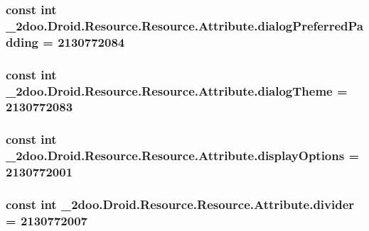 \hypertarget{class__2doo_1_1_droid_1_1_resource_1_1_attribute_50098b9f4818622b5467f03b505deaad}{
\subsubsection[{dialogPreferredPadding}]{\setlength{\rightskip}{0pt plus 5cm}const int \_\-2doo.Droid.Resource.Resource.Attribute.dialogPreferredPadding = 2130772084}}
\label{class__2doo_1_1_droid_1_1_resource_1_1_attribute_50098b9f4818622b5467f03b505deaad}


\hypertarget{class__2doo_1_1_droid_1_1_resource_1_1_attribute_bc571f819c346596fd5dbe29a2e3cd86}{
\subsubsection[{dialogTheme}]{\setlength{\rightskip}{0pt plus 5cm}const int \_\-2doo.Droid.Resource.Resource.Attribute.dialogTheme = 2130772083}}
\label{class__2doo_1_1_droid_1_1_resource_1_1_attribute_bc571f819c346596fd5dbe29a2e3cd86}


\hypertarget{class__2doo_1_1_droid_1_1_resource_1_1_attribute_68a63a7d1077b26855834a7e387400d9}{
\subsubsection[{displayOptions}]{\setlength{\rightskip}{0pt plus 5cm}const int \_\-2doo.Droid.Resource.Resource.Attribute.displayOptions = 2130772001}}
\label{class__2doo_1_1_droid_1_1_resource_1_1_attribute_68a63a7d1077b26855834a7e387400d9}


\hypertarget{class__2doo_1_1_droid_1_1_resource_1_1_attribute_8fc561bc3a692edb498f9a955a74cf79}{
\subsubsection[{divider}]{\setlength{\rightskip}{0pt plus 5cm}const int \_\-2doo.Droid.Resource.Resource.Attribute.divider = 2130772007}}
\label{class__2doo_1_1_droid_1_1_resource_1_1_attribute_8fc561bc3a692edb498f9a955a74cf79}


